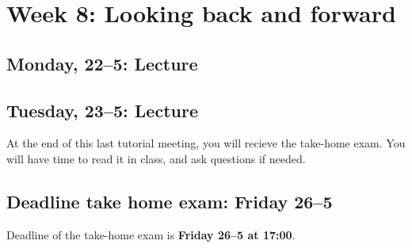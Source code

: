 \section*{Week 8: Looking back and forward}

\subsection*{Monday, 22--5: Lecture}

\subsection*{Tuesday, 23--5: Lecture}
At the end of this last tutorial meeting, you will recieve the take-home exam. You will have time to read it in class, and ask questions if needed. \\

\subsection*{Deadline take home exam: Friday 26--5}
Deadline of the take-home exam is \textbf{Friday 26--5 at 17:00}.







